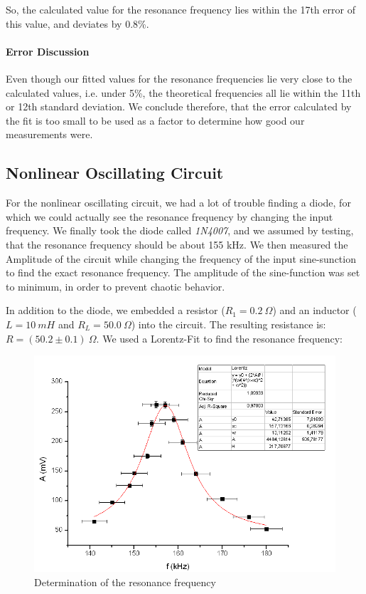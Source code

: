 So, the calculated value for the resonance frequency lies within the 17th error of this value, and deviates by 0.8\%.

\paragraph{Error Discussion}

Even though our fitted values for the resonance frequencies lie very close to the calculated values, i.e. under 5\%, the theoretical frequencies all lie within the 11th or 12th standard deviation. We conclude therefore, that the error calculated by the fit is too small to be used as a factor to determine how good our measurements were.

\subsection{Nonlinear Oscillating Circuit}

For the nonlinear oscillating circuit, we had a lot of trouble finding a diode, for which we could actually see the resonance frequency by changing the input frequency. We finally took the diode called \emph{1N4007}, and we assumed by testing, that the resonance frequency should be about 155 kHz. We then measured the Amplitude of the circuit while changing the frequency of the input sine-sunction to find the exact resonance frequency. The amplitude of the sine-function was set to minimum, in order to prevent chaotic behavior.

In addition to the diode, we embedded a resistor ($R_1= 0.2 \ \Omega$) and an inductor ($L=10\ mH$ and $R_L = 50.0\ \Omega$) into the circuit. The resulting resistance is: $R = (50.2 \pm 0.1)\ \Omega$. We used a Lorentz-Fit to find the resonance frequency:

\begin{figure}[H]
\centering \includegraphics[width=\textwidth]{Bilder/fresnl.png}
\caption{Determination of the resonance frequency}
\end{figure}

